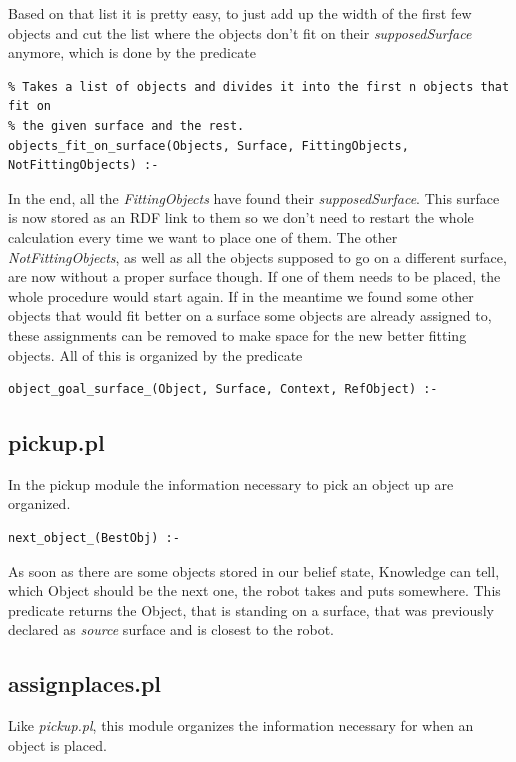 \documentclass[main.tex]{subfiles}
\begin{document}
Based on that list it is pretty easy, to just add up the width of the first few objects and cut the list where the objects don't fit on their \textit{supposedSurface} anymore, which is done by the predicate
\begin{lstlisting}
% Takes a list of objects and divides it into the first n objects that fit on
% the given surface and the rest.
objects_fit_on_surface(Objects, Surface, FittingObjects, NotFittingObjects) :-
\end{lstlisting}

In the end, all the \textit{FittingObjects} have found their \textit{supposedSurface}. This surface is now stored as an RDF link to them so we don't need to restart the whole calculation every time we want to place one of them. The other \textit{NotFittingObjects}, as well as all the objects supposed to go on a different surface, are now without a proper surface though. If one of them needs to be placed, the whole procedure would start again. If in the meantime we found some other objects that would fit better on a surface some objects are already assigned to, these assignments can be removed to make space for the new better fitting objects. All of this is organized by the predicate 
\begin{lstlisting}
object_goal_surface_(Object, Surface, Context, RefObject) :-
\end{lstlisting}

\subsection{pickup.pl}\label{sec:kn_pickup}

In the pickup module the information necessary to pick an object up are organized.

\begin{lstlisting}
next_object_(BestObj) :-
\end{lstlisting}
As soon as there are some objects stored in our belief state, Knowledge can tell, which Object should be the next one, the robot takes and puts somewhere. This predicate returns the Object, that is standing on a surface, that was previously declared as \textit{source} surface and is closest to the robot.

\subsection{assignplaces.pl}

Like \textit{pickup.pl}, this module organizes the information necessary for when an object is placed.\\
\end{document}
